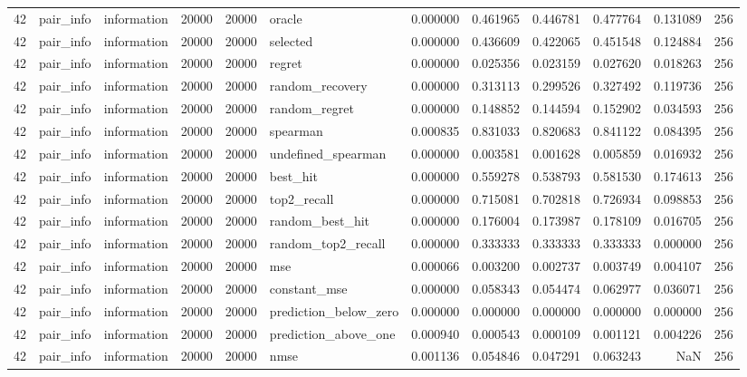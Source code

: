 \begin{tabular}{rllrrlrrrrrr}
42 & pair_info & information & 20000 & 20000 & oracle & 0.000000 & 0.461965 & 0.446781 & 0.477764 & 0.131089 & 256 \\
42 & pair_info & information & 20000 & 20000 & selected & 0.000000 & 0.436609 & 0.422065 & 0.451548 & 0.124884 & 256 \\
42 & pair_info & information & 20000 & 20000 & regret & 0.000000 & 0.025356 & 0.023159 & 0.027620 & 0.018263 & 256 \\
42 & pair_info & information & 20000 & 20000 & random_recovery & 0.000000 & 0.313113 & 0.299526 & 0.327492 & 0.119736 & 256 \\
42 & pair_info & information & 20000 & 20000 & random_regret & 0.000000 & 0.148852 & 0.144594 & 0.152902 & 0.034593 & 256 \\
42 & pair_info & information & 20000 & 20000 & spearman & 0.000835 & 0.831033 & 0.820683 & 0.841122 & 0.084395 & 256 \\
42 & pair_info & information & 20000 & 20000 & undefined_spearman & 0.000000 & 0.003581 & 0.001628 & 0.005859 & 0.016932 & 256 \\
42 & pair_info & information & 20000 & 20000 & best_hit & 0.000000 & 0.559278 & 0.538793 & 0.581530 & 0.174613 & 256 \\
42 & pair_info & information & 20000 & 20000 & top2_recall & 0.000000 & 0.715081 & 0.702818 & 0.726934 & 0.098853 & 256 \\
42 & pair_info & information & 20000 & 20000 & random_best_hit & 0.000000 & 0.176004 & 0.173987 & 0.178109 & 0.016705 & 256 \\
42 & pair_info & information & 20000 & 20000 & random_top2_recall & 0.000000 & 0.333333 & 0.333333 & 0.333333 & 0.000000 & 256 \\
42 & pair_info & information & 20000 & 20000 & mse & 0.000066 & 0.003200 & 0.002737 & 0.003749 & 0.004107 & 256 \\
42 & pair_info & information & 20000 & 20000 & constant_mse & 0.000000 & 0.058343 & 0.054474 & 0.062977 & 0.036071 & 256 \\
42 & pair_info & information & 20000 & 20000 & prediction_below_zero & 0.000000 & 0.000000 & 0.000000 & 0.000000 & 0.000000 & 256 \\
42 & pair_info & information & 20000 & 20000 & prediction_above_one & 0.000940 & 0.000543 & 0.000109 & 0.001121 & 0.004226 & 256 \\
42 & pair_info & information & 20000 & 20000 & nmse & 0.001136 & 0.054846 & 0.047291 & 0.063243 & NaN & 256 \\

\end{tabular}
